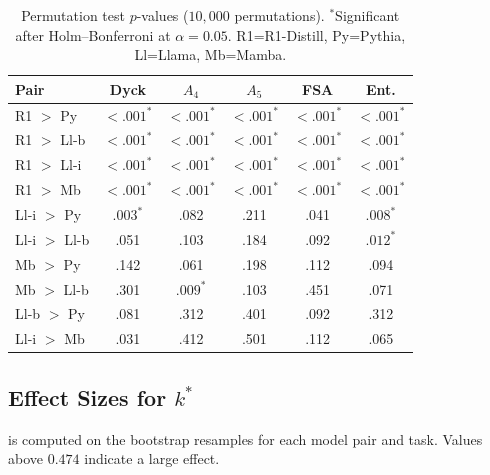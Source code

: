 \documentclass[11pt]{article}
\newcommand{\stepk}{k}
\begin{document}
\begin{table}[ht]
\centering\small
\setlength{\tabcolsep}{2pt}
\begin{tabular}{@{}lccccc@{}}
\toprule
Pair & Dyck & $A_4$ & $A_5$ & FSA & Ent. \\
\midrule
R1 $>$ Py    & ${<}.001^{*}$ & ${<}.001^{*}$ & ${<}.001^{*}$ & ${<}.001^{*}$ & ${<}.001^{*}$ \\
R1 $>$ Ll-b  & ${<}.001^{*}$ & ${<}.001^{*}$ & ${<}.001^{*}$ & ${<}.001^{*}$ & ${<}.001^{*}$ \\
R1 $>$ Ll-i  & ${<}.001^{*}$ & ${<}.001^{*}$ & ${<}.001^{*}$ & ${<}.001^{*}$ & ${<}.001^{*}$ \\
R1 $>$ Mb    & ${<}.001^{*}$ & ${<}.001^{*}$ & ${<}.001^{*}$ & ${<}.001^{*}$ & ${<}.001^{*}$ \\
Ll-i $>$ Py  & $.003^{*}$ & .082 & .211 & .041 & $.008^{*}$ \\
Ll-i $>$ Ll-b & .051 & .103 & .184 & .092 & $.012^{*}$ \\
Mb $>$ Py    & .142 & .061 & .198 & .112 & .094 \\
Mb $>$ Ll-b  & .301 & $.009^{*}$ & .103 & .451 & .071 \\
Ll-b $>$ Py  & .081 & .312 & .401 & .092 & .312 \\
Ll-i $>$ Mb  & .031 & .412 & .501 & .112 & .065 \\
\bottomrule
\end{tabular}
\caption{Permutation test $p$-values ($10{,}000$ permutations).
$^{*}$Significant after Holm--Bonferroni at $\alpha=0.05$.
R1=R1-Distill, Py=Pythia, Ll=Llama, Mb=Mamba.}
\label{tab:permutation-tests}
\end{table}

\subsection{Effect Sizes for $\stepk^{*}$}
\label{app:stattests-effect}

 is computed on the bootstrap resamples for each model
pair and task. Values above $0.474$ indicate a large effect.
\end{document}
